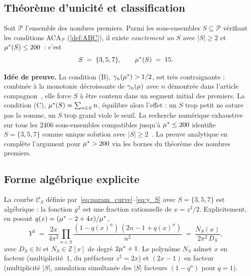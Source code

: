 \subsection{Théorème d'unicité et classification}
\label{sec:courbe:classification}

\begin{theoreme}
\label{thm:courbe_classification}
Soit $\mathcal P$ l'ensemble des nombres premiers. Parmi les sous-ensembles $S \subseteq \mathcal P$ vérifiant les conditions ACA$_{\mathcal P}$ (\ref{def:ABC}), il existe \emph{exactement un} $S$ avec $|S| \geq 2$ et $\mu^{*}(S) \leq 200$~: c'est
\[
S \;=\; \{3, 5, 7\}, \qquad \mu^{*}(S) \;=\; 15.
\]
\end{theoreme}

\textbf{Idée de preuve.} La condition (B), $\gamma_{n}(\mu^{*}) > 1/2$, est très contraignante : combinée à la monotonie décroissante de $\gamma_{n}(\mu)$ avec $n$ démontrée dans l'article compagnon~\cite{companion_M2}, elle force $S$ à être contenu dans un segment initial des premiers. La condition (C), $\mu^{*}(S) = \sum_{n \in S} n$, équilibre alors l'effet : un $S$ trop petit ne sature pas la somme, un $S$ trop grand viole le seuil. La recherche numérique exhaustive sur tous les $2406$ sous-ensembles compatibles jusqu'à $\mu^{*} \leq 200$ identifie $S = \{3, 5, 7\}$ comme unique solution avec $|S| \geq 2$~\cite[\S 5]{PT_GeoFlow_PersistenceCurve}. La preuve analytique en complète l'argument pour $\mu^{*} > 200$ via les bornes du théorème des nombres premiers.

\subsection{Forme algébrique explicite}
\label{sec:courbe:forme}

\begin{theoreme}
\label{thm:algebraicite_PT}
La courbe $\mathcal C_S$ définie par~\eqref{eq:param_curve}--\eqref{eq:y_S} avec $S = \{3, 5, 7\}$ est algébrique : la fonction $y^{2}$ est une fraction rationnelle de $x = z^{2}/2$. Explicitement, en posant $q(x) = (\mu^{*} - 2 + 4x)/\mu^{*}$,
\begin{equation}
Y^{2} \;=\; \dfrac{2x}{4\pi^{2}} \prod_{n \in S} \dfrac{(1 - q(x)^{n})\,(2n - 1 + q(x)^{n})}{n^{2}} \;=\; \dfrac{N_S(x)}{2\pi^{2}\,D_S},
\label{eq:Y_squared}
\end{equation}
avec $D_S \in \mathbb N$ et $N_S \in \mathbb Z[x]$ de degré $2 \mu^{*} + 1$. Le polynôme $N_S$ admet $x$ en facteur (multiplicité~$1$, du préfacteur $z^{2} = 2x$) et $(2x - 1)$ en facteur (multiplicité $|S|$, annulation simultanée des $|S|$ facteurs $(1 - q^{n})$ pour $q = 1$).
\end{theoreme}

